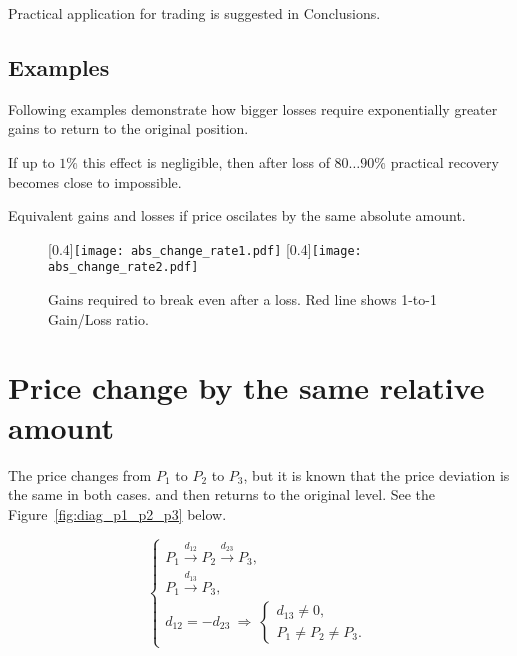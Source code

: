 \documentclass[a4paper]{article}
\begin{document}
Practical application for trading is suggested in Conclusions.

\subsection*{Examples}

Following examples demonstrate how bigger losses require exponentially greater
gains to return to the original position.

If up to $1\%$ this effect is negligible, then after loss of $80 \dots 90\%$
practical recovery becomes close to impossible.

\begin{table}[H]
  \centering
  \caption{Equivalent gains and losses if price oscilates by the same absolute amount.}
  \label{tab:abs_change}
\end{table}

\begin{figure}[H]  %
\centering
\hfill  %
  [0.4\textwidth]{\texttt{[image: abs\_change\_rate1.pdf]}}
\hfill
{}
  [0.4\textwidth]{\texttt{[image: abs\_change\_rate2.pdf]}}
\hfill
\caption{Gains required to break even after a loss. Red line shows 1-to-1 Gain/Loss ratio.}
\label{fig:abs_change}
\end{figure}

\section*{Price change by the same relative amount}

The price changes from $P_1$ to $P_2$ to $P_3$, but it is known that
the price deviation is the same in both cases.
and then returns to the original level.
See the Figure~\ref{fig:diag_p1_p2_p3} below.

\begin{equation}
  \begin{cases}
    P_1 \xrightarrow{d_{12}} P_2 \xrightarrow{d_{23}} P_3,\\
    P_1 \xrightarrow{d_{13}} P_3,\\
    d_{12} = -d_{23} \ \Rightarrow \ \begin{cases}
                                       d_{13} \ne 0,\\
                                       P_1 \ne P_2 \ne P_3.
                                     \end{cases}
  \end{cases}
\end{equation}
\end{document}
